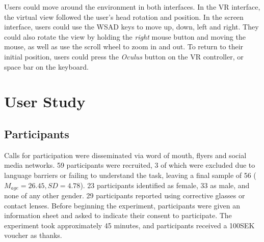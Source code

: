 \documentclass[letterpaper, 10 pt, conference]{ieeeconf}  %
\begin{document}
Users could move around the environment in both interfaces. In the VR interface, the virtual view followed the user's head rotation and position. In the screen interface, users could use the WSAD keys to move up, down, left and right. They could also rotate the view by holding the \textit{right} mouse button and moving the mouse, as well as use the scroll wheel to zoom in and out. To return to their initial position, users could press the \textit{Oculus} button on the VR controller, or space bar on the keyboard. 





%










\section{User Study}

\subsection{Participants}
Calls for participation were disseminated via word of mouth, flyers and social media networks. 59 participants were recruited, 3 of which were excluded due to language barriers or failing to understand the task, leaving a final sample of 56 ($M_{age} = 26.45, SD = 4.78$). 23 participants identified as female, 33 as male, and none of any other gender. 29 participants reported using corrective glasses or contact lenses. Before beginning the experiment, participants were given an information sheet and asked to indicate their consent to participate. The experiment took approximately 45 minutes, and participants received a 100SEK voucher as thanks.

\end{document}
